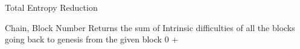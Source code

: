 \begin{algorithm}
\caption{Total Entropy Reduction}
\label{Total_Entropy_Reduction}
\begin{algorithmic}[3]
\Require Chain, Block Number
\Ensure Returns the sum of Intrinsic difficulties of all the blocks going back to genesis from the given block
    \State \Return $0$
\Else
    \State \Return {} +
\EndIf
\EndFunction
\end{algorithmic}
\end{algorithm}

